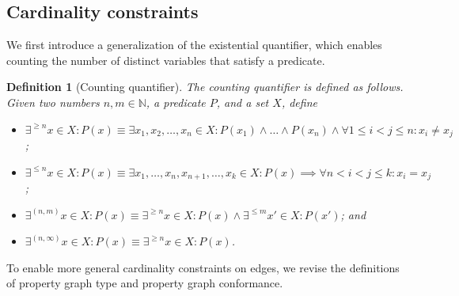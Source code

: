 \documentclass[a4paper]{article}
\newtheorem{definition}[theorem]{Definition}
\newcommand{\N}{\mathbb{N}}
\begin{document}
\subsection{Cardinality constraints}

We first introduce a generalization of the existential quantifier, which enables counting the number of distinct variables that satisfy a predicate.

\begin{definition}[Counting quantifier]
  The \emph{counting quantifier} is defined as follows. Given two numbers $n, m \in \N$, a predicate $P$, and a set $X$, define
  \begin{itemize}
    \item $\exists^{\geq n} x \in X : P(x) \equiv \exists x_1, x_2, \ldots, x_n \in X : P(x_1) \wedge \ldots \wedge P(x_n) \wedge \forall 1 \leq i < j \leq n : x_i \neq x_j$;
    \item $\exists^{\leq n} x \in X : P(x) \equiv \exists x_1, \ldots, x_n, x_{n+1}, \ldots, x_k \in X : P(x) \implies \forall n < i < j \leq k : x_i = x_j$;
    \item $\exists^{(n, m)} x \in X : P(x) \equiv \exists^{\geq n} x \in X : P(x) \wedge \exists^{\leq m} x' \in X : P(x')$; and
    \item $\exists^{(n, \infty)} x \in X : P(x) \equiv \exists^{\geq n} x \in X : P(x)$.
  \end{itemize}
\end{definition}

To enable more general cardinality constraints on edges, we revise the definitions of property graph type and property graph conformance.
\end{document}
